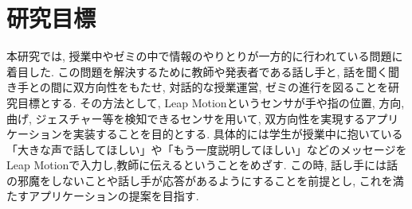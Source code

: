 \documentclass{funthesis}
\begin{document}
\section{研究目標}
本研究では, 授業中やゼミの中で情報のやりとりが一方的に行われている問題に着目した. この問題を解決するために教師や発表者である話し手と, 話を聞く聞き手との間に双方向性をもたせ,  対話的な授業運営, ゼミの進行を図ることを研究目標とする. その方法として, Leap Motionというセンサが手や指の位置, 方向, 曲げ, ジェスチャー等を検知できるセンサを用いて, 双方向性を実現するアプリケーションを実装することを目的とする. 具体的には学生が授業中に抱いている「大きな声で話してほしい」や「もう一度説明してほしい」などのメッセージをLeap Motionで入力し,教師に伝えるということをめざす. この時, 話し手には話の邪魔をしないことや話し手が応答があるようにすることを前提とし, これを満たすアプリケーションの提案を目指す. 







\end{document}
